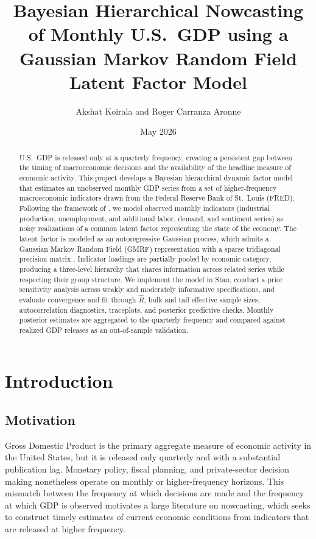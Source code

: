 \documentclass[11pt]{article}
\title{Bayesian Hierarchical Nowcasting of Monthly U.S.\ GDP using a Gaussian Markov Random Field Latent Factor Model}
\author{Akshat Koirala and Roger Carranza Aronne}
\date{May 2026}
\begin{document}
\maketitle

\begin{abstract}
U.S.\ GDP is released only at a quarterly frequency, creating a persistent gap between the timing of macroeconomic decisions and the availability of the headline measure of economic activity. This project develops a Bayesian hierarchical dynamic factor model that estimates an unobserved monthly GDP series from a set of higher-frequency macroeconomic indicators drawn from the Federal Reserve Bank of St.\ Louis (FRED). Following the framework of \citet{aruoba2009real}, we model observed monthly indicators (industrial production, unemployment, and additional labor, demand, and sentiment series) as noisy realizations of a common latent factor representing the state of the economy. The latent factor is modeled as an autoregressive Gaussian process, which admits a Gaussian Markov Random Field (GMRF) representation with a sparse tridiagonal precision matrix \citep{rue2005gaussian}. Indicator loadings are partially pooled by economic category, producing a three-level hierarchy that shares information across related series while respecting their group structure. We implement the model in Stan, conduct a prior sensitivity analysis across weakly and moderately informative specifications, and evaluate convergence and fit through $\hat{R}$, bulk and tail effective sample sizes, autocorrelation diagnostics, traceplots, and posterior predictive checks. Monthly posterior estimates are aggregated to the quarterly frequency and compared against realized GDP releases as an out-of-sample validation.
\end{abstract}

\tableofcontents

\section{Introduction}

\subsection{Motivation}

Gross Domestic Product is the primary aggregate measure of economic activity in the United States, but it is released only quarterly and with a substantial publication lag. Monetary policy, fiscal planning, and private-sector decision making nonetheless operate on monthly or higher-frequency horizons. This mismatch between the frequency at which decisions are made and the frequency at which GDP is observed motivates a large literature on nowcasting, which seeks to construct timely estimates of current economic conditions from indicators that are released at higher frequency.
\end{document}
